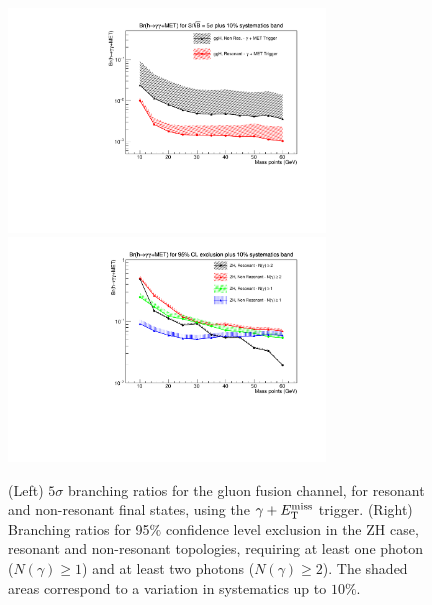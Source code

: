 \begin{figure}[htbp]
\centering
\includegraphics[width=0.75\textwidth]{finalresults/branchingratio_ggh.pdf}
\includegraphics[width=0.75\textwidth]{finalresults/exclusion_zh.pdf}
\caption{(Left) $5\sigma$ branching ratios for the gluon fusion channel, for resonant and non-resonant final states, using the $\gamma+E_{\mathrm{T}}^{\text{miss}}$ trigger. (Right) Branching ratios for 95$\%$ confidence level exclusion in the ZH case, resonant and non-resonant topologies, requiring at least one photon ($N(\gamma) \geq 1$) and at least two photons ($N(\gamma) \geq 2$). The shaded areas correspond to a variation in systematics up to $10\%$.}
\label{fig:branching_5sigma}
\end{figure}
